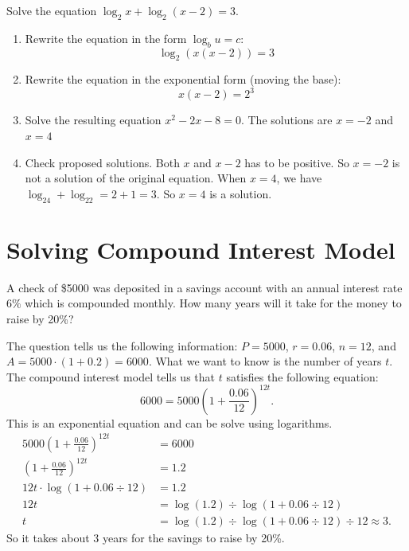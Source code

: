 \documentclass[en,12pt]{elegantbook}
\providecommand{\tightlist}{%
  \setlength{\itemsep}{0pt}\setlength{\parskip}{0pt}}
\providecommand{\tightlist}{%
  \setlength{\itemsep}{0pt}\setlength{\parskip}{0pt}}
\let\BeginKnitrBlock\begin \let\EndKnitrBlock\end
\begin{document}
\BeginKnitrBlock{example}
\protect\hypertarget{exm:unnamed-chunk-314}{}{\label{exm:unnamed-chunk-314} }
Solve the equation \(\log_2 x + \log_2 (x - 2) = 3\).
\EndKnitrBlock{example}

\BeginKnitrBlock{solution}


\begin{enumerate}
\def\labelenumi{\arabic{enumi}.}
\tightlist
\item
  Rewrite the equation in the form \(\log_bu=c\):
  \[\log_2(x(x - 2)) = 3\]
\item
  Rewrite the equation in the exponential form (moving the base):
  \[x(x-2)=2^3\]
\item
  Solve the resulting equation \(x^2-2x-8=0\). The solutions are \(x=-2\) and \(x=4\)
\item
  Check proposed solutions. Both \(x\) and \(x-2\) has to be positive. So \(x=-2\) is not a solution of the original equation. When \(x=4\), we have \(\log_24+\log_22=2+1=3\). So \(x=4\) is a solution.
\end{enumerate}
\EndKnitrBlock{solution}

\hypertarget{solving-compound-interest-model}{%
\section{Solving Compound Interest Model}\label{solving-compound-interest-model}}

\BeginKnitrBlock{example}
\protect\hypertarget{exm:unnamed-chunk-316}{}{\label{exm:unnamed-chunk-316} }
A check of \$5000 was deposited in a savings account with an annual interest rate \(6\%\) which is compounded monthly. How many years will it take for the money to raise by 20\%?
\EndKnitrBlock{example}

\BeginKnitrBlock{solution}


The question tells us the following information:
\(P=5000\), \(r=0.06\), \(n=12\), and \(A=5000\cdot (1+0.2)=6000\). What we want to know is the number of years \(t\). The compound interest model tells us that \(t\) satisfies the following equation:
\[
6000=5000\left(1+\frac{0.06}{12}\right)^{12t}.
\]
This is an exponential equation and can be solve using logarithms.
\[
\begin{aligned}
5000\left(1+\frac{0.06}{12}\right)^{12t}&=6000\\
\left(1+\frac{0.06}{12}\right)^{12t}&=1.2\\
12t\cdot \log\left(1+0.06\div 12\right)&=1.2\\
12t&=\log(1.2)\div \log(1+0.06\div 12)\\
t&=\log(1.2)\div\log(1+0.06\div 12)\div 12\approx 3.
\end{aligned}
\]
So it takes about 3 years for the savings to raise by 20\%.
\EndKnitrBlock{solution}
\end{document}
